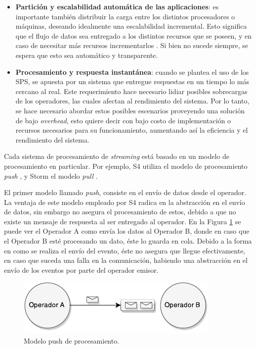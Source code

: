 \begin{itemize}
	\item \textbf{Partición y escalabilidad automática de las aplicaciones}: es importante también distribuir la carga entre los distintos procesadores o máquinas, deseando idealmente una escalabilidad incremental. Esto significa que el flujo de datos sea entregado a los distintos recursos que se poseen, y en caso de necesitar más recursos incrementarlos \citep{bookTanenbaum}. Si bien no sucede siempre, se espera que esto sea automático y transparente.
	\item \textbf{Procesamiento y respuesta instantánea}: cuando se plantea el uso de los SPS, se apuesta por un sistema que entregue respuestas en un tiempo lo más cercano al real. Este requerimiento hace necesario lidiar posibles sobrecargas de los operadores, las cuales afectan al rendimiento del sistema. Por lo tanto, se hace necesario abordar estos posibles escenarios proveyendo una solución de bajo \textit{overhead}, esto quiere decir con bajo costo de implementación o recursos necesarios para su funcionamiento, aumentando así la eficiencia y el rendimiento del sistema.
\end{itemize}

Cada sistema de procesamiento de \textsl{streaming} está basado en un modelo de procesamiento en particular. Por ejemplo, S4 utiliza el modelo de procesamiento \textsl{push} \citep{s4yahoo}, y Storm el modelo \textsl{pull} \citep{stormtwitter}.

El primer modelo llamado \textit{push}, consiste en el envío de datos desde el operador. La ventaja de este modelo empleado por S4 radica en la abstracción en el envío de datos, sin embargo no asegura el procesamiento de estos, debido a que no existe un mensaje de respuesta al ser entregado al operador. En la Figura \ref{fig:sps-push} se puede ver el Operador A como envía los datos al Operador B, donde en caso que el Operador B esté procesando un dato, éste lo guarda en cola. Debido a la forma en como se realiza el envío del evento, éste no asegura que llegue efectivamente, en caso que suceda una falla en la comunicación, habiendo una abstracción en el envío de los eventos por parte del operador emisor.

\begin{figure}[ht!]
  \centering
    \includegraphics[scale=1]{images/SPS-Push.pdf}
  \caption{Modelo push de procesamiento.}
  \label{fig:sps-push}
\end{figure}

